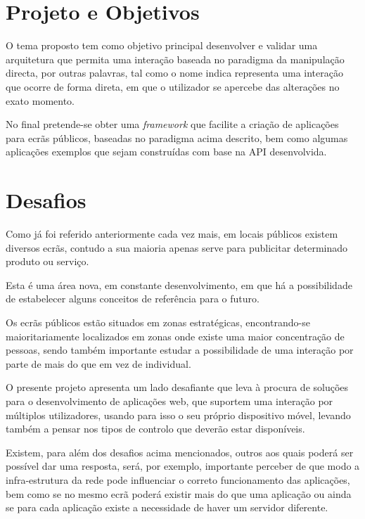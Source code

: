 \section{Projeto e Objetivos} \label{sec:proj}

O tema proposto tem como objetivo principal desenvolver e validar uma arquitetura que permita uma interação baseada no paradigma da manipulação directa, por outras palavras, tal como o nome indica representa uma interação que ocorre de forma direta, em que o utilizador se apercebe das alterações no exato momento.  

No final pretende-se obter uma \textit{framework} que facilite a criação de aplicações para ecrãs públicos, baseadas no paradigma acima descrito, bem como algumas aplicações exemplos que sejam construídas com base na API desenvolvida.

\section{Desafios} \label{sec:goals}

Como já foi referido anteriormente cada vez mais, em locais públicos existem diversos ecrãs, contudo a sua maioria apenas serve para publicitar determinado produto ou serviço. 

Esta é uma área nova, em constante desenvolvimento, em que há a possibilidade de estabelecer alguns conceitos de referência para o futuro.

Os ecrãs públicos estão situados em zonas estratégicas, encontrando-se maioritariamente localizados em zonas onde existe uma maior concentração de pessoas, sendo também importante estudar a possibilidade de uma interação por parte de mais do que  em vez de individual.

O presente projeto apresenta um lado desafiante que leva à procura de soluções para o desenvolvimento de aplicações web, que suportem uma interação por múltiplos utilizadores, usando para isso o seu próprio dispositivo móvel, levando também a pensar nos tipos de controlo que deverão estar disponíveis. 

Existem, para além dos desafios acima mencionados, outros aos quais poderá ser possível dar uma resposta, será, por exemplo, importante perceber de que modo a infra-estrutura da rede pode influenciar o correto funcionamento das aplicações, bem como se no mesmo ecrã poderá existir mais do que uma aplicação ou ainda se para cada aplicação existe a necessidade de haver um servidor diferente. 

